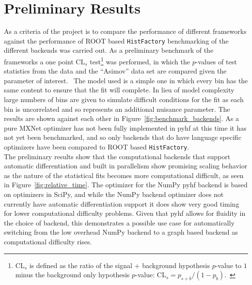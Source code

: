 \section{Preliminary Results}\label{section:results}

As a criteria of the project is to compare the performance of different frameworks against the performance of ROOT based \texttt{HistFactory} benchmarking of the different backends was carried out.
As a preliminary benchmark of the frameworks a one point $\text{CL}_{s}$ test\footnote{$\text{CL}_{s}$ is defined as the ratio of the signal + background hypothesis $p$-value to $1$ minus the background only hypothesis $p$-value: $\text{CL}_{s} = p_{s+b}/\left(1-p_{b}\right)$.~\cite{Cowan:2010js}} was performed, in which the $p$-values of test statistics from the data and the ``Asimov'' data set are compared given the parameter of interest.~\cite{Cowan:2010js}
The model used is a simple one in which every bin has the same content to ensure that the fit will complete.
In lieu of model complexity large numbers of bins are given to simulate difficult conditions for the fit as each bin is uncorrelated and so represents an additional nuisance parameter.
The results are shown against each other in Figure~\ref{fig:benchmark_backends}.
As a pure MXNet optimizer has not been fully implemented in pyhf at this time it has not yet been benchmarked, and so only backends that do have language specific optimizers have been compared to ROOT based \texttt{HistFactory}.\\

The preliminary results show that the computational backends that support automatic differentiation and built in parallelism show promising scaling behavior as the nature of the statistical fits becomes more computational difficult, as seen in Figure~\ref{fig:relative_time}.
The optimizer for the NumPy pyhf backend is based on optimizers in SciPy, and while the NumPy backend optimizer does not currently have automatic differentiation support it does show very good timing for lower computational difficulty problems.
Given that pyhf allows for fluidity in the choice of backend, this demonstrates a possible use case for automatically switching from the low overhead NumPy backend to a graph based backend as computational difficulty rises.


